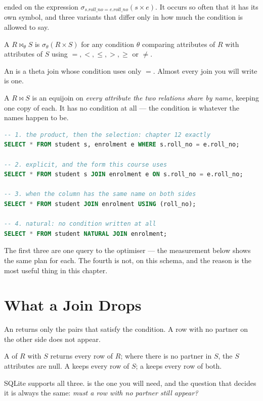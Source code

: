  ended on the expression
$\sigma_{\mathit{s.roll\_no}=\mathit{e.roll\_no}}(\mathit{s} \times
\mathit{e})$. It occurs so often that it has its own symbol, and three
variants that differ only in how much the condition is allowed to say.

\begin{definitionbox}
A  $R \bowtie_{\theta} S$ is $\sigma_{\theta}(R \times S)$
for any condition $\theta$ comparing attributes of $R$ with attributes of $S$
using $=, <, \le, >, \ge$ or $\neq$.

\smallskip
An  is a theta join whose condition uses only $=$. Almost every
join you will write is one.

\smallskip
A  $R \bowtie S$ is an equijoin on \emph{every attribute
the two relations share by name}, keeping one copy of each. It has no
condition at all --- the condition is whatever the names happen to be.
\end{definitionbox}

\begin{examplebox}
\begin{lstlisting}[language=sql]
-- 1. the product, then the selection: chapter 12 exactly
SELECT * FROM student s, enrolment e WHERE s.roll_no = e.roll_no;

-- 2. explicit, and the form this course uses
SELECT * FROM student s JOIN enrolment e ON s.roll_no = e.roll_no;

-- 3. when the column has the same name on both sides
SELECT * FROM student JOIN enrolment USING (roll_no);

-- 4. natural: no condition written at all
SELECT * FROM student NATURAL JOIN enrolment;
\end{lstlisting}

\smallskip
The first three are one query to the optimiser --- the measurement below shows
the same plan for each. The fourth is not, on this schema, and the reason is
the most useful thing in this chapter.
\end{examplebox}

\section{What a Join Drops}

\begin{definitionbox}
An  returns only the pairs that satisfy the condition. A row
with no partner on the other side does not appear.

\smallskip
A  of $R$ with $S$ returns every row of $R$; where
there is no partner in $S$, the $S$ attributes are null. A  keeps every row of $S$; a  keeps every row of
both.

\smallskip
SQLite supports all three.  is the one you will need, and the
question that decides it is always the same: \emph{must a row with no partner
still appear?}
\end{definitionbox}

